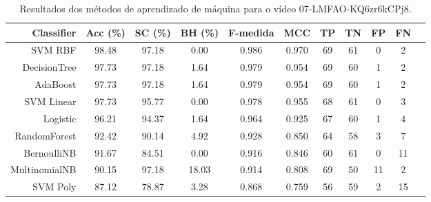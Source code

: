 \begin{table}[!htb]
\centering
\caption{Resultados dos métodos de aprendizado de máquina para o vídeo 07-LMFAO-KQ6zr6kCPj8.}
\label{tab:07-LMFAO-KQ6zr6kCPj8}
\begin{tabular}{r|c|c|c|c|c|c|c|c|c|c}
\hline\hline
Classifier & Acc (\%) & SC (\%) & BH (\%) & F-medida & MCC & TP & TN & FP & FN \\ \hline
SVM RBF & 98.48 & 97.18 & 0.00 & 0.986 & 0.970 & 69 & 61 & 0 & 2 \\ 
DecisionTree & 97.73 & 97.18 & 1.64 & 0.979 & 0.954 & 69 & 60 & 1 & 2 \\ 
AdaBoost & 97.73 & 97.18 & 1.64 & 0.979 & 0.954 & 69 & 60 & 1 & 2 \\ 
SVM Linear & 97.73 & 95.77 & 0.00 & 0.978 & 0.955 & 68 & 61 & 0 & 3 \\ 
Logistic & 96.21 & 94.37 & 1.64 & 0.964 & 0.925 & 67 & 60 & 1 & 4 \\ 
RandomForest & 92.42 & 90.14 & 4.92 & 0.928 & 0.850 & 64 & 58 & 3 & 7 \\ 
BernoulliNB & 91.67 & 84.51 & 0.00 & 0.916 & 0.846 & 60 & 61 & 0 & 11 \\ 
MultinomialNB & 90.15 & 97.18 & 18.03 & 0.914 & 0.808 & 69 & 50 & 11 & 2 \\ 
SVM Poly & 87.12 & 78.87 & 3.28 & 0.868 & 0.759 & 56 & 59 & 2 & 15 \\ 
\hline\hline
\end{tabular}
\end{table}
